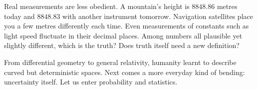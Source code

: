 Real measurements are less obedient. A mountain's height is $8848.86$ metres today and $8848.83$ with another instrument tomorrow. Navigation satellites place you a few metres differently each time. Even measurements of constants such as light speed fluctuate in their decimal places. Among numbers all plausible yet slightly different, which is the truth? Does truth itself need a new definition?

From differential geometry to general relativity, humanity learnt to describe curved but deterministic spaces. Next comes a more everyday kind of bending: uncertainty itself. Let us enter probability and statistics.
